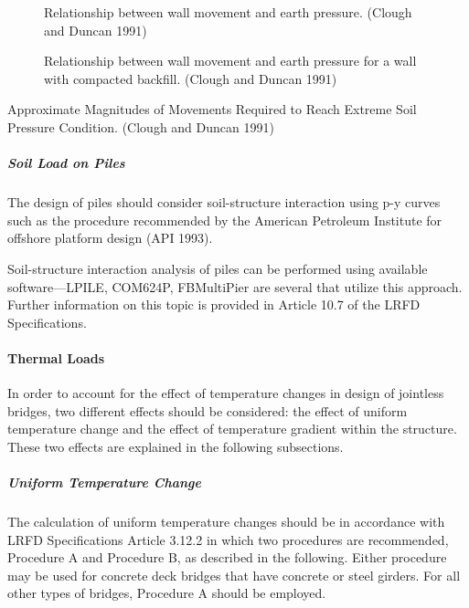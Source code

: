\begin{figure}
  \caption{Relationship between wall movement and earth pressure. (Clough and Duncan 1991)}\label{fig:wall-movement-earth-pressure}
\end{figure}

\begin{figure}
  \caption{Relationship between wall movement and earth pressure for a wall with compacted backfill. (Clough and  Duncan 1991)}\label{fig:wall-movement-earth-pressure-backfill}
\end{figure}

\begin{table}
  \caption{Approximate Magnitudes of Movements Required to Reach Extreme Soil Pressure Condition. (Clough and Duncan 1991)}\label{tab:movement-reach-extreme}
\end{table}

\subparagraph{Soil Load on Piles}
The design of piles should consider soil-structure interaction using p-y curves such as the procedure recommended by the American Petroleum Institute for offshore platform design (API 1993).

Soil-structure interaction analysis of piles can be performed using available software—LPILE, COM624P, FBMultiPier
are several that utilize this approach. Further information on this topic is provided in Article 10.7 of the
LRFD Specifications.

\paragraph{Thermal Loads}

In order to account for the effect of temperature changes in design of jointless bridges, two different effects
should be considered: the effect of uniform temperature change and the effect of temperature gradient within the
structure. These two effects are explained in the following subsections.

\subparagraph{Uniform Temperature Change}
The calculation of uniform temperature changes should be in accordance with LRFD Specifications Article 3.12.2
in which two procedures are recommended, Procedure A and Procedure B, as described in the following. Either
procedure may be used for concrete deck bridges that have concrete or steel girders. For all other types of bridges,
Procedure A should be employed.

